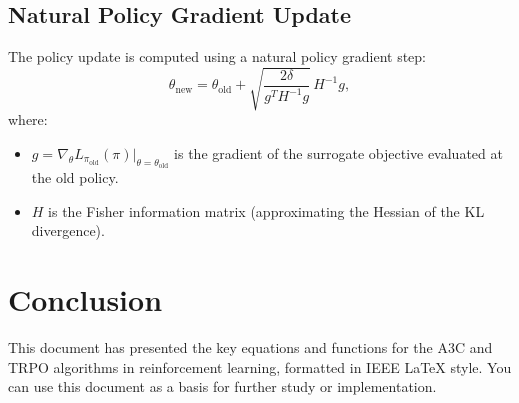 \documentclass[conference]{IEEEtran}
\begin{document}
\subsection{Natural Policy Gradient Update}
The policy update is computed using a natural policy gradient step:
\begin{equation}
\theta_{\text{new}} = \theta_{\text{old}} + \sqrt{\frac{2\delta}{g^T H^{-1} g}}\, H^{-1} g,
\end{equation}
where:
\begin{itemize}
    \item \( g = \nabla_\theta L_{\pi_{\text{old}}}(\pi)\big|_{\theta=\theta_{\text{old}}} \) is the gradient of the surrogate objective evaluated at the old policy.
    \item \( H \) is the Fisher information matrix (approximating the Hessian of the KL divergence).
\end{itemize}

\section{Conclusion}
This document has presented the key equations and functions for the A3C and TRPO algorithms in reinforcement learning, formatted in IEEE LaTeX style. You can use this document as a basis for further study or implementation.


\end{document}
